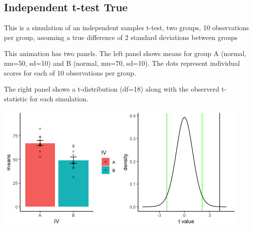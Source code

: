 \documentclass[
]{book}
\begin{document}
\hypertarget{independent-t-test-true}{%
\subsection{Independent t-test True}\label{independent-t-test-true}}

This is a simulation of an independent samples t-test, two groups, 10 observations per group, assuming a true difference of 2 standard deviations between groups

This animation has two panels. The left panel shows means for group A (normal, mu=50, sd=10) and B (normal, mu=70, sd=10). The dots represent individual scores for each of 10 observations per group.

The right panel shows a t-distribution (df=18) along with the observerd t-statistic for each simulation.

\includegraphics{gifs/indTtestTrue.gif}
\end{document}
